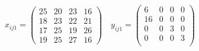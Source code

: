 \\
\begin{equation*}
x_{i j 1}=
\begin{pmatrix}
25 &20& 23& 16\\
18 &23 &22 &21\\
17& 25& 19& 26\\
19& 25 &27 &16
\end{pmatrix}
\quad
y_{i j 1}=
\begin{pmatrix}
6 &0 &0&0\\
16& 0 &0 &0\\
0 &0 &3 &0\\
0& 0& 0& 3\\
\end{pmatrix}
\end{equation*}
